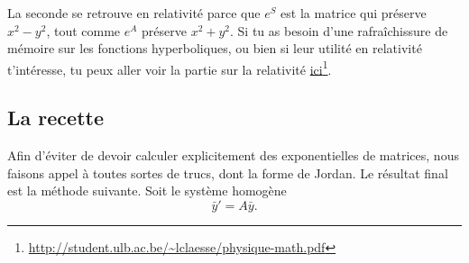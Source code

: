 La seconde se retrouve en relativité parce que $e^S$ est la matrice qui préserve $x^2-y^2$, tout comme $e^A$ préserve $x^2+y^2$. Si tu as besoin d'une rafraîchissure de mémoire sur les fonctions hyperboliques, ou bien si leur utilité en relativité t'intéresse, tu peux aller voir la partie sur la relativité \href{http://student.ulb.ac.be/~lclaesse/physique-math.pdf}{ici}\footnote{ \url{http://student.ulb.ac.be/~lclaesse/physique-math.pdf}}.

					\subsection{La recette}

Afin d'éviter de devoir calculer explicitement des exponentielles de matrices, nous faisons appel à toutes sortes de trucs, dont la forme de Jordan. Le résultat final est la méthode suivante. Soit le système homogène
\begin{equation}
	\bar y'=A\bar y.
\end{equation}

